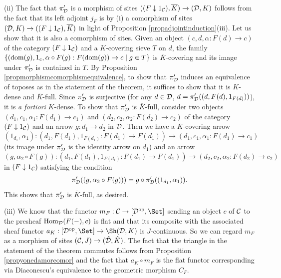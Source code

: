 \documentclass[a4paper,12pt]{article}
\begin{document}
\begin{proofs}
	(ii) The fact that $\pi_{\cal D}'$ is a morphism of sites $((F \downarrow 1_{\cal C}), \overline{K})\to ({\cal D}, K)$ follows from the fact that its left adjoint $j_{F}$ is by (i) a comorphism of sites $({\cal D}, K) \to ((F \downarrow 1_{\cal C}), \overline{K})$ in light of Proposition \ref{propadjointinduction}(iii). Let us show that it is also a comorphism of sites. Given an object $(c,d, \alpha:F(d)\to c)$ of the category $(F \downarrow 1_{\cal C})$ and a $K$-covering sieve $T$ on $d$, the family $\{(\textup{dom}(g), 1_{c}, \alpha\circ F(g):F(\textup{dom}(g))\to c \mid g\in T\}$ is $\overline{K}$-covering and its image under $\pi_{\cal D}'$ is contained in $T$. By Proposition \ref{propmorphismcomorphismequivalence}, to show that $\pi_{\cal D}'$ induces an equivalence of toposes as in the statement of the theorem, it suffices to show that it is $K$-dense and $\overline{K}$-full. Since $\pi_{\cal D}'$ is surjective (for any $d\in {\cal D}$, $d=\pi_{\cal D}'((d, F(d), 1_{F(d)}))$), it is \emph{a fortiori} $K$-dense. To show that $\pi_{\cal D}'$ is $\overline{K}$-full, consider two objects $(d_{1}, c_{1}, \alpha_{1}:F(d_{1})\to c_{1})$ and $(d_{2}, c_{2}, \alpha_{2}:F(d_{2})\to c_{2})$ of the category $(F \downarrow 1_{\cal C})$ and an arrow $g:d_{1}\to d_{2}$ in $\cal D$. Then we have a $\overline{K}$-covering arrow $$(1_{d_{1}}, \alpha_{1}):(d_{1}, F(d_{1}), 1_{F(d_{1})}:F(d_{1})\to F(d_{1}))\to (d_{1}, c_{1}, \alpha_{1}:F(d_{1})\to c_{1})$$ (its image under $\pi_{\cal D}'$ is the identity arrow on $d_{1}$) and an arrow $$(g, \alpha_{2}\circ F(g)):(d_{1}, F(d_{1}), 1_{F(d_{1})}:F(d_{1})\to F(d_{1}))\to (d_{2}, c_{2}, \alpha_{2}:F(d_{2})\to c_{2})$$ in $(F \downarrow 1_{\cal C})$  satisfying the condition 
	\[
	\pi_{\cal D}'((g, \alpha_{2}\circ F(g)))=g\circ \pi_{\cal D}'((1_{d_{1}}, \alpha_{1})).
	\]   
	This shows that $\pi_{\cal D}'$ is $\overline{K}$-full, as desired.
	
	(iii) We know that the functor $m_{F}:{\cal C}\to [{\cal D}^{\textup{op}}, \Set]$ sending an object $c$ of $\cal C$ to the presheaf $\textup{Hom}_{\cal D}(F(-), c)$ is flat and that its composite with the associated sheaf functor $a_{K}:[{\cal D}^{\textup{op}}, \Set]\to \Sh({\cal D}, K)$ is $J$-continuous. So we can regard $m_{F}$ as a morphism of sites $({\cal C}, J)\to (\hat{\cal D}, \hat{K})$. The fact that the triangle in the statement of the theorem commutes follows from  Proposition \ref{propyonedamorcomor} and the fact that $a_{K}\circ m_{F}$ is the flat functor corresponding via Diaconescu's equivalence to the geometric morphism $C_{F}$.
\end{proofs}
\end{document}

